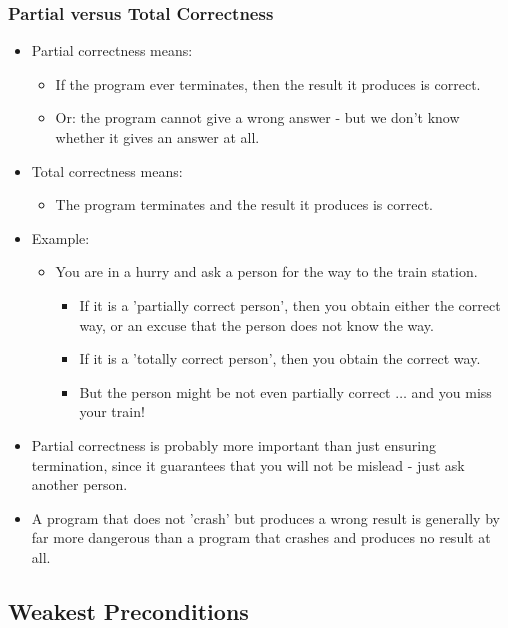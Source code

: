 \begin{multicols}{2}
\subsubsection{Partial versus Total Correctness}
\begin{itemize}
  \item Partial correctness means:
  \begin{itemize}
    \item If the program ever terminates, then the result it produces is correct.
    \item Or: the program cannot give a wrong answer - but we don't know whether it gives an answer at all.
  \end{itemize}
  \item Total correctness means:
  \begin{itemize}
    \item The program terminates and the result it produces is correct.
  \end{itemize}
  \item Example:
  \begin{itemize}
    \item You are in a hurry and ask a person for the way to the train station.
    \begin{itemize}
      \item If it is a 'partially correct person', then you obtain either the correct way, or an excuse that the person does not know the way.
      \item If it is a 'totally correct person', then you obtain the correct way.
      \item But the person might be not even partially correct $\ldots$ and you miss your train!
    \end{itemize}
  \end{itemize}
  \item Partial correctness is probably more important than just ensuring termination, since it guarantees that you will not be mislead - just ask another person.
  \item A program that does not 'crash' but produces a wrong result is generally by far more dangerous than a program that crashes and produces no result at all.
\end{itemize}

\subsection{Weakest Preconditions}

\end{multicols}
